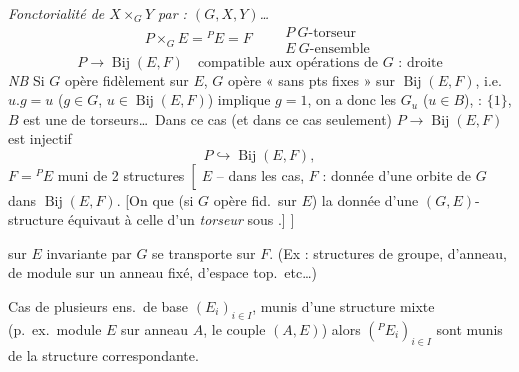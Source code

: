 \documentclass[11pt,a4paper]{article}
\begin{document}
\emph{Fonctorialité de $X \times_G Y$ par : $(G, X, Y)$…}
\[
  P \times_G E = {}^{P}E = F \qquad
  \begin{array}{l}
    P \ G\text{-torseur} \\
    E \ G\text{-ensemble}
  \end{array}
\]
\[
  P \to \operatorname{Bij}(E, F) \quad \text{compatible aux opérations de } G
  \text{ : droite}
\]
\emph{NB} Si $G$ opère fidèlement sur $E$, $G$ opère « sans pts fixes »
sur $\operatorname{Bij}(E, F)$, i.e.\ $u.g = u$ ($g \in G$,
$u \in \operatorname{Bij}(E, F)$) implique $g = 1$, on a donc les
$G_u$ ($u \in B$), \ill{} : $\{1\}$, \ill{} $B$ est une \ill{} de
torseurs…\ Dans ce cas (et dans ce cas seulement)
$P \to \operatorname{Bij}(E, F)$ est injectif
\[
  P \hookrightarrow \operatorname{Bij}(E, F),
\]
$F = {}^{P}E$  muni de 2 structures
$\Bigl[$ $E$ -- dans les cas, $F$ \ill{} : donnée d'une orbite de $G$ dans
$\operatorname{Bij}(E, F)$. [On  que (si $G$ opère fid.\ sur
$E$) la donnée  \ill{} d'une
$(G, E)$-structure \ill{} équivaut à celle d'un \emph{torseur} sous
 \ill{} \ill{}.] $\Bigr]$

sur $E$ invariante par $G$ se transporte sur $F$.
(Ex : structures de groupe, d'anneau, de module sur un anneau fixé, d'espace
top.\ etc…)

Cas de plusieurs ens.\ de base $(E_i)_{i \in I}$, \struck{\ill{}} munis d'une
structure mixte (p.\ ex.\ module $E$ sur anneau $A$, le couple $(A, E)$)
alors $({}^{P}E_i)_{i \in I}$ sont munis de la structure correspondante.

\struck{\ill{}}
\end{document}
